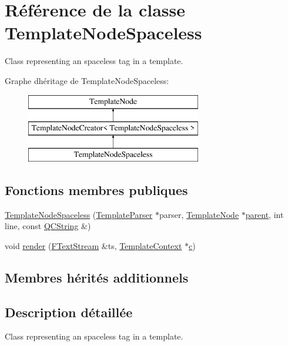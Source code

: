 \hypertarget{class_template_node_spaceless}{}\section{Référence de la classe Template\+Node\+Spaceless}
\label{class_template_node_spaceless}


Class representing an \textquotesingle{}spaceless\textquotesingle{} tag in a template.  


Graphe d\textquotesingle{}héritage de Template\+Node\+Spaceless\+:\begin{figure}[H]
\begin{center}
\leavevmode
\includegraphics[height=3.000000cm]{class_template_node_spaceless}
\end{center}
\end{figure}
\subsection*{Fonctions membres publiques}
\begin{DoxyCompactItemize}
\item 
\hyperlink{class_template_node_spaceless_a28140e5a4e0e5da21352996866316a71}{Template\+Node\+Spaceless} (\hyperlink{class_template_parser}{Template\+Parser} $\ast$parser, \hyperlink{class_template_node}{Template\+Node} $\ast$\hyperlink{class_template_node_a69a306ef84e62af9fe57bf9aacc94536}{parent}, int line, const \hyperlink{class_q_c_string}{Q\+C\+String} \&)
\item 
void \hyperlink{class_template_node_spaceless_ae50d34987b7474cdef27f3a2ebce8b3a}{render} (\hyperlink{class_f_text_stream}{F\+Text\+Stream} \&ts, \hyperlink{class_template_context}{Template\+Context} $\ast$\hyperlink{060__command__switch_8tcl_ab14f56bc3bd7680490ece4ad7815465f}{c})
\end{DoxyCompactItemize}
\subsection*{Membres hérités additionnels}


\subsection{Description détaillée}
Class representing an \textquotesingle{}spaceless\textquotesingle{} tag in a template. 

